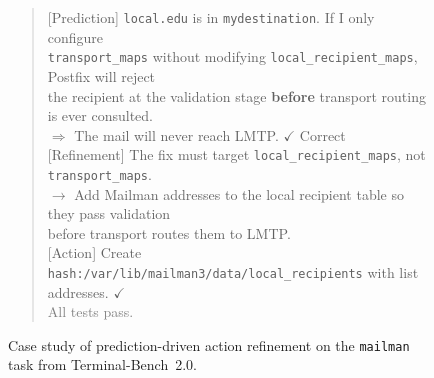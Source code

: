 \begin{figure}[t]
\begin{tcolorbox}[
  colback=gray!3, colframe=black!50, boxrule=0.5pt,
  title={\textbf{Case Study: Accurate Environment Prediction Enables Action Refinement}},
  fonttitle=\bfseries\small, boxrule=0.5pt, arc=2pt
]
\vspace{4pt}

\begin{tcolorbox}[colback=caseafter!5!white, colframe=caseafter, boxrule=0.4pt, arc=1pt, title={\textbf{After LWM RL}}, fonttitle=\small]

\begin{quote}
\ttfamily\scriptsize
\textcolor{blue!70!black}{[Prediction]} \texttt{local.edu} is in \texttt{mydestination}. If I only configure\\
\texttt{transport\_maps} without modifying \texttt{local\_recipient\_maps}, Postfix will reject\\
the recipient at the validation stage \textbf{before} transport routing is ever consulted.\\
$\Rightarrow$ The mail will never reach LMTP. \textcolor{caseafter}{$\checkmark$ Correct}\\[4pt]
\textcolor{orange!70!black}{[Refinement]} The fix must target \texttt{local\_recipient\_maps}, not \texttt{transport\_maps}.\\
\hspace{0.5cm} $\rightarrow$ Add Mailman addresses to the local recipient table so they pass validation\\
\hspace{0.5cm} before transport routes them to LMTP.\\[4pt]
\textcolor{teal!80!black}{[Action]} Create \texttt{hash:/var/lib/mailman3/data/local\_recipients} with list addresses. \textcolor{caseafter}{$\checkmark$}\\
\textcolor{gray}{All tests pass.}
\end{quote}
\end{tcolorbox}

\end{tcolorbox}

\caption{Case study of prediction-driven action refinement on the \texttt{mailman} task from Terminal-Bench~2.0.}
\label{fig:case-prediction-refine}
\end{figure}













